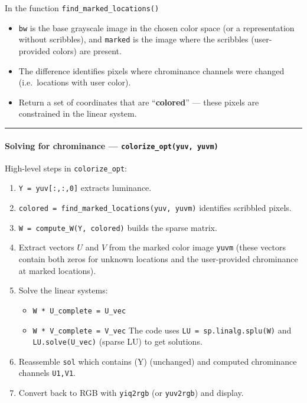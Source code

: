 \documentclass[11pt]{article}
\providecommand{\tightlist}{%
      \setlength{\itemsep}{0pt}\setlength{\parskip}{0pt}}
\begin{document}
In the function \texttt{find\_marked\_locations()}

\begin{itemize}
\tightlist
\item
  \texttt{bw} is the base grayscale image in the chosen color space (or
  a representation without scribbles), and \texttt{marked} is the image
  where the scribbles (user-provided colors) are present.
\item
  The difference identifies pixels where chrominance channels were
  changed (i.e.~locations with user color).
\item
  Return a set of coordinates that are ``\textbf{colored}'' --- these
  pixels are constrained in the linear system.
\end{itemize}

\begin{center}\rule{0.5\linewidth}{0.5pt}\end{center}

\hypertarget{solving-for-chrominance-colorize_optyuv-yuvm}{%
\paragraph{\texorpdfstring{\textbf{Solving for chrominance ---
\texttt{colorize\_opt(yuv,\ yuvm)}}}{Solving for chrominance --- colorize\_opt(yuv, yuvm)}}\label{solving-for-chrominance-colorize_optyuv-yuvm}}

High-level steps in \texttt{colorize\_opt}:

\begin{enumerate}
\def\labelenumi{\arabic{enumi}.}
\tightlist
\item
  \texttt{Y\ =\ yuv{[}:,:,0{]}} extracts luminance.
\item
  \texttt{colored\ =\ find\_marked\_locations(yuv,\ yuvm)} identifies
  scribbled pixels.
\item
  \texttt{W\ =\ compute\_W(Y,\ colored)} builds the sparse matrix.
\item
  Extract vectors \(U\) and \(V\) from the marked color image
  \texttt{yuvm} (these vectors contain both zeros for unknown locations
  and the user-provided chrominance at marked locations).
\item
  Solve the linear systems:

  \begin{itemize}
  \tightlist
  \item
    \texttt{W\ *\ U\_complete\ =\ U\_vec}
  \item
    \texttt{W\ *\ V\_complete\ =\ V\_vec} The code uses
    \texttt{LU\ =\ sp.linalg.splu(W)} and \texttt{LU.solve(U\_vec)}
    (sparse LU) to get solutions.
  \end{itemize}
\item
  Reassemble \texttt{sol} which contains (Y) (unchanged) and computed
  chrominance channels \texttt{U1,V1}.
\item
  Convert back to RGB with \texttt{yiq2rgb} (or \texttt{yuv2rgb}) and
  display.
\end{enumerate}
\end{document}
